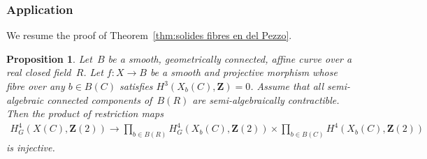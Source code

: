 \documentclass[JEP,XML,SOM,Unicode]{cedram}
\theoremstyle{plain}
\newtheorem{prop}[thm]{Proposition}
\theoremstyle{definition}
\numberwithin{equation}{section}
\newcommand{\Z}{{\mathbf Z}}
\begin{document}
\subsubsection{Application}

We resume the proof of Theorem~\ref{thm:solides fibres en del Pezzo}.

\begin{prop}\label{prop:Leraybizarre}
Let~$B$ be a smooth, geometrically connected, affine curve over a real closed field~$R$.
Let $f:X\to B$ be a smooth and projective morphism
whose fibre over any $b \in B(C)$ satisfies $H^3(X_b(C),\Z)=0$.
Assume that all semi-algebraic connected components of~$B(R)$ are semi-algebraically
contractible.
Then the product of restriction maps
\begin{align*}
H^4_G(X(C),\Z(2)) \to \prod_{b \in B(R)} H^4_G(X_b(C),\Z(2)) \times \prod_{b \in B(C)} H^4(X_b(C),\Z(2))
\end{align*}
is injective.
\end{prop}
\end{document}
